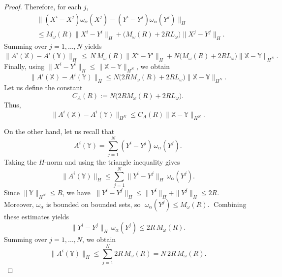\documentclass[10pt,a4paper]{amsart}
\begin{document}
\begin{proof}
Therefore, for each $j$,
\begin{equation*}
\begin{aligned}
    &\|(X^i - X^j)\omega_\alpha(X^j) - (Y^i - Y^j)\omega_\alpha(Y^j)\|_H \\
    & \le M_\omega(R)\|X^i - Y^i\|_H + \big(M_\omega(R) + 2R L_\omega\big)\|X^j - Y^j\|_H.
\end{aligned}
\end{equation*}
Summing over $j=1,\dots,N$ yields
\begin{equation*}
    \|A^i(\mathds{X}) - A^i(\mathds{Y})\|_H \,\le\, N\, M_\omega(R)\|X^i - Y^i\|_H + N\big(M_\omega(R) + 2R L_\omega\big) \|\mathds{X} - \mathds{Y}\|_{H^N}.
\end{equation*}
Finally, using $\|X^i - Y^i\|_H \le \|\mathds{X} - \mathds{Y}\|_{H^N}$, we obtain
\begin{equation*}
    \|A^i(\mathds{X}) - A^i(\mathds{Y})\|_H \le N\big(2R M_\omega(R) + 2R L_\omega\big) \|\mathds{X} - \mathds{Y}\|_{H^N}.
\end{equation*}
Let us define the constant
\begin{equation*}
    C_A(R) := N\big(2R M_\omega(R) + 2R L_\omega\big).
\end{equation*}
Thus,
\begin{equation}\label{eq: A lip}
    \|A^i(\mathds{X}) - A^i(\mathds{Y})\|_{H^N} \le C_A(R)\|\mathds{X} - \mathds{Y}\|_{H^N}.
\end{equation}

On the other hand, let us recall that
\begin{equation*}
    A^i(\mathds{Y}) = \sum_{j=1}^N (Y^i - Y^j)\,\omega_\alpha(Y^j).
\end{equation*}
Taking the $H$-norm and using the triangle inequality gives
\begin{equation*}
    \|A^i(\mathds{Y})\|_{H} \le \sum_{j=1}^N \|Y^i - Y^j\|_{H}\,\omega_\alpha(Y^j).
\end{equation*}
Since $\|\mathds{Y}\|_{H^N} \le R$, we have $\;\|Y^i - Y^j\|_{H} \le \|Y^i\|_{H} + \|Y^j\|_{H} \le 2R.\;$
Moreover, $\omega_\alpha$ is bounded on bounded sets, so  $\;\omega_\alpha(Y^j) \le M_\omega(R).\;$ Combining these estimates yields
\begin{equation*}
    \|Y^i - Y^j\|_{H}\,\omega_\alpha(Y^j) \le 2R\,M_\omega(R).
\end{equation*}
Summing over $j=1,\dots,N$, we obtain
\begin{equation}\label{eq: A bound}
    \|A^i(\mathds{Y})\|_{H} \le \sum_{j=1}^N 2R\,M_\omega(R) = N \, 2R \, M_\omega(R).
\end{equation}


\end{proof}
\end{document}
